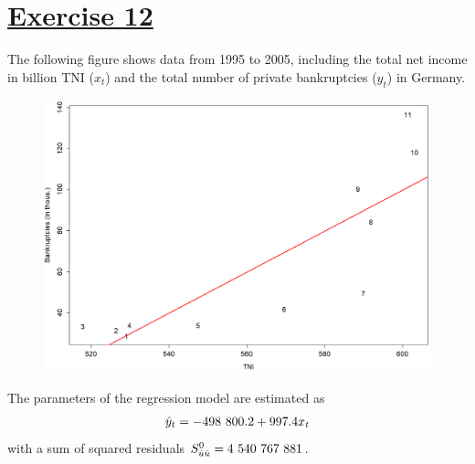 \documentclass[captions=tableheading, 12pt, headings=small, parskip=half]{scrartcl}
\begin{document}
\section*{\underline{Exercise 12}}

The following figure shows data from 1995 to 2005, including the total net income in billion TNI ($x_t$) and the total number of private bankruptcies ($y_t$) in Germany.
\begin{figure}[H]
	\centering
	\includegraphics[width = 0.7\columnwidth]{Code2/insolvenzen.png}
\end{figure}
The parameters of the regression model are estimated as
\[
	\hat{y}_t = -498\hphantom{i}800.2 + 997.4 x_t
\]with a sum of squared residuals $S_{\hat{u}\hat{u}}^{\text{0}} = 4\hphantom{i}540\hphantom{i}767\hphantom{i}881$.
\end{document}
